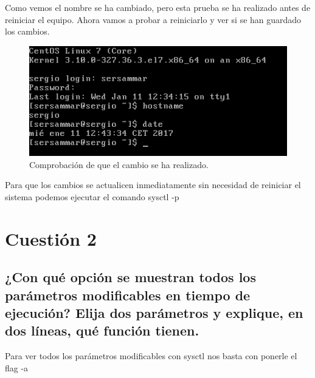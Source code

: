 Como vemos el nombre se ha cambiado, pero esta prueba se ha realizado antes de reiniciar el equipo. Ahora vamos a probar a reiniciarlo y ver si se han guardado los cambios.

\begin{figure}[H] %
	\centering
	\includegraphics[scale=0.5]{imagenes/nombre-post.png}  %
	\caption{Comprobación de que el cambio se ha realizado.} \label{fig:figura4}
\end{figure}


Para que los cambios se actualicen inmediatamente sin necesidad de reiniciar el sistema podemos ejecutar el comando sysctl -p 




\section{Cuestión 2}

\subsection{\Large  ¿Con qué opción se muestran todos los parámetros modificables en tiempo de ejecución? Elija dos parámetros y explique, en dos líneas, qué función tienen.}

Para ver todos los parámetros modificables con sysctl nos basta con ponerle el flag -a \cite{man-sysctl}

